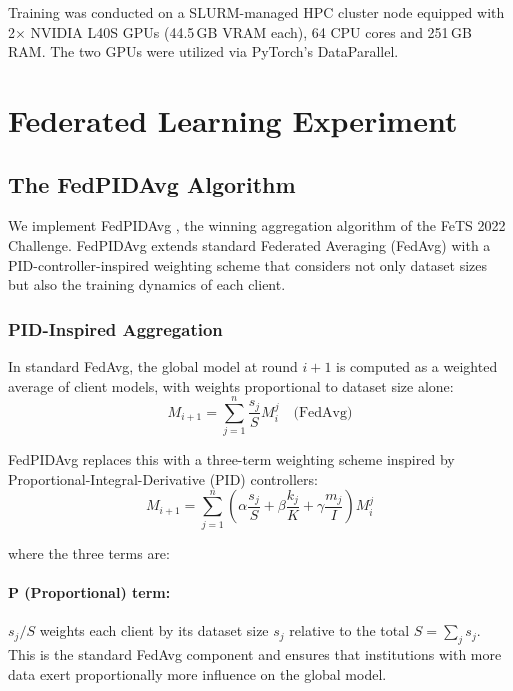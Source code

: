 \documentclass{article}
\begin{document}
Training was conducted on a SLURM-managed HPC cluster node equipped with 2$\times$ NVIDIA L40S GPUs (44.5\,GB VRAM each), 64 CPU cores and 251\,GB RAM. The two GPUs were utilized via PyTorch's DataParallel.

\section{Federated Learning Experiment}
\label{sec:fl}

\subsection{The FedPIDAvg Algorithm}

We implement FedPIDAvg \cite{hatamizadeh_swin_2022_fedpidavg}, the winning aggregation algorithm of the FeTS 2022 Challenge. FedPIDAvg extends standard Federated Averaging (FedAvg) with a PID-controller-inspired weighting scheme that considers not only dataset sizes but also the training dynamics of each client.

\subsubsection{PID-Inspired Aggregation}

In standard FedAvg, the global model at round $i+1$ is computed as a weighted average of client models, with weights proportional to dataset size alone:
\begin{equation}
    M_{i+1} = \sum_{j=1}^{n} \frac{s_j}{S} M_i^j \quad \text{(FedAvg)}
\end{equation}

FedPIDAvg replaces this with a three-term weighting scheme inspired by Proportional-Integral-Derivative (PID) controllers:
\begin{equation}
    M_{i+1} = \sum_{j=1}^{n} \left( \alpha \frac{s_j}{S} + \beta \frac{k_j}{K} + \gamma \frac{m_j}{I} \right) M_i^j
\end{equation}

where the three terms are:

\paragraph{P (Proportional) term:} $s_j / S$ weights each client by its dataset size $s_j$ relative to the total $S = \sum_j s_j$. This is the standard FedAvg component and ensures that institutions with more data exert proportionally more influence on the global model.
\end{document}
